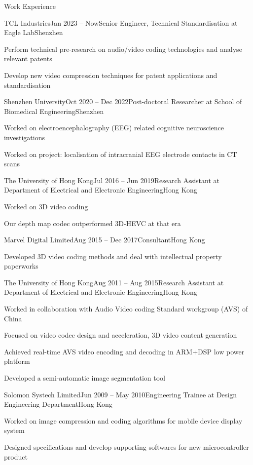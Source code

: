 \documentclass{resume} %
\begin{document}
\begin{rSection}{Work Experience}
	\begin{rSubsection}{TCL Industries}{Jan 2023 -- Now}{Senior Engineer, Technical Standardisation at Eagle Lab}{Shenzhen}
		\item Perform technical pre-research on audio/video coding technologies and analyse relevant patents
		\item Develop new video compression techniques for patent applications and standardisation
	\end{rSubsection}
	
	\begin{rSubsection}{Shenzhen University}{Oct 2020 -- Dec 2022}{Post-doctoral Researcher at School of Biomedical Engineering}{Shenzhen}
		\item Worked on electroencephalography (EEG) related cognitive neuroscience investigations
		\item Worked on project: localisation of intracranial EEG electrode contacts in CT scans
	\end{rSubsection}
	
	\begin{rSubsection}{The University of Hong Kong}{Jul 2016 -- Jun 2019}{Research Assistant at Department of Electrical and Electronic Engineering}{Hong Kong}
		\item Worked on 3D video coding
		\item Our depth map codec outperformed 3D-HEVC at that era
	\end{rSubsection}
	
	\begin{rSubsection}{Marvel Digital Limited}{Aug 2015 -- Dec 2017}{Consultant}{Hong Kong}
		\item Developed 3D video coding methods and deal with intellectual property paperworks 
	\end{rSubsection}
	
	\begin{rSubsection}{The University of Hong Kong}{Aug 2011 -- Aug 2015}{Research Assistant at Department of Electrical and Electronic Engineering}{Hong Kong}
		\item Worked in collaboration with Audio Video coding Standard workgroup (AVS)  of China
		\item Focused on video codec design and acceleration, 3D video content generation
		\item Achieved real-time AVS video encoding and decoding in ARM+DSP low power platform
		\item Developed a semi-automatic image segmentation tool
	\end{rSubsection}
	
	\begin{rSubsection}{Solomon Systech Limited}{Jun 2009 -- May 2010}{Engineering Trainee at Design Engineering Department}{Hong Kong}
		\item Worked on image compression and coding algorithms for mobile device display system
		\item Designed specifications and develop supporting softwares for new microcontroller product
	\end{rSubsection}
\end{rSection}
\end{document}
